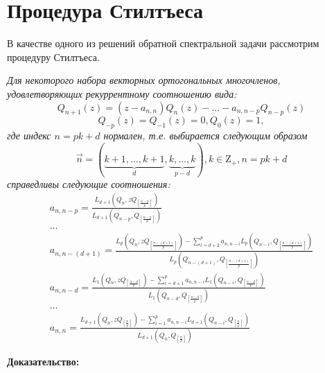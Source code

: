 \section{Процедура Стилтъеса} В качестве одного из решений
обратной спектральной задачи рассмотрим процедуру
Стилтъеса.
\begin{teor}
\textit{ 
Для некоторого набора векторных ортогональных многочленов, удовлетворяющих
рекуррентному соотношению вида:
\begin{equation}
\label{StieltO}
Q_{n+1}(z)=(z-a_{n,n})Q_n(z)-\ldots-a_{n,n-p}Q_{n-p}(z)
\end{equation}
$$
Q_{-p}(z)=Q_{-1}(z)=0,  Q_0(z)=1,
$$
где индекс $n=pk+d$ нормален, т.е. выбирается следующим образом
$$\overrightarrow{n}=(\underbrace{k+1,\ldots,k+1}_{d},\underbrace{k,\ldots,k}_{p-d}),
k\in{\mbox{Z}}_{+},n=pk+d$$ 
справедливы следующие соотношения:}
\begin{equation}
\label{StieltA}
\begin{array} {cccccccccccccc}
a_{n,n-p} = \displaystyle\frac{L_{d+1}(Q_n,zQ_{\left[\frac{n-p}{p}\right]})}{L_{d+1}(Q_{n-p},Q_{\left[\frac{n-p}{p}\right]})} \\
\ldots \\
a_{n,n-(d+1)} = \displaystyle\frac{L_{p}(Q_n,zQ_{\left[\frac{n-(d+1)}{p}\right]}) - \displaystyle\sum\limits_{i=d+2}^{p} {a_{n,n-i}L_p(Q_{n-i},Q_{\left[\frac{n-(d+1)}{p}\right]})}}{L_{p}(Q_{n-(d+1)},Q_{\left[\frac{n-(d+1)}{p}\right]})} \\
a_{n,n-d} = \displaystyle\frac{L_{1}(Q_n,zQ_{\left[\frac{n-d}{p}\right]}) - \displaystyle\sum\limits_{i=d+1}^{p} {a_{n,n-i}L_1(Q_{n-i},Q_{\left[\frac{n-d}{p}\right]})}}{L_{1}(Q_{n-d},Q_{\left[\frac{n-d}{p}\right]})} \\
\ldots \\
a_{n,n} = \displaystyle\frac{L_{d+1}(Q_n,zQ_{\left[\frac{n}{p}\right]}) - \displaystyle\sum\limits_{i=1}^{p} {a_{n,n-i}L_{d+1}(Q_{n-i},Q_{\left[\frac{n}{p}\right]})}}{L_{d+1}(Q_{n},Q_{\left[\frac{n}{p}\right]})}
\end{array}
\end{equation}
\end{teor}
\textbf {Доказательство:} \\
